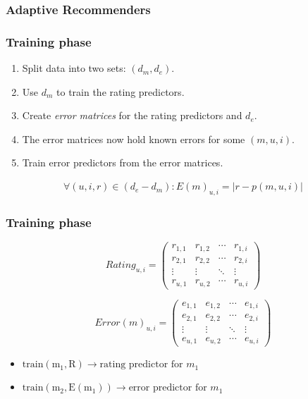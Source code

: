 \documentclass[screen]{beamer}
\begin{document}
\begin{frame}
  \frametitle{Adaptive Recommenders}
  
\end{frame}

\begin{frame}
  \frametitle{Training phase}
  
  \begin{enumerate}
    \item Split data into two sets: $(d_m,d_e)$.
    \item Use $d_m$ to train the rating predictors.
    \item Create \emph{error matrices} for the rating predictors and $d_e$. 
    \item The error matrices now hold known errors for some $(m,u,i)$.
    \item Train error predictors from the error matrices.
  \end{enumerate}
  
  \begin{eqnarray}
    \forall (u,i,r) \in (d_e - d_m): E(m)_{u,i} = |r - p(m,u,i)|
  \end{eqnarray}
\end{frame}

\begin{frame}
  \frametitle{Training phase}
  
  \begin{equation*}
     Rating_{u,i} =
     \begin{pmatrix}
      r_{1,1} & r_{1,2} & \cdots & r_{1,i} \\
      r_{2,1} & r_{2,2} & \cdots & r_{2,i} \\
      \vdots  & \vdots  & \ddots & \vdots  \\
      r_{u,1} & r_{u,2} & \cdots & r_{u,i}
     \end{pmatrix}
    \end{equation*}

  \vspace{1em}
  
    \begin{equation*}
     Error(m)_{u,i} =
     \begin{pmatrix}
        e_{1,1} & e_{1,2} & \cdots & e_{1,i} \\
        e_{2,1} & e_{2,2} & \cdots & e_{2,i} \\
        \vdots  & \vdots  & \ddots & \vdots  \\
        e_{u,1} & e_{u,2} & \cdots & e_{u,i}
     \end{pmatrix}
    \end{equation*}
    
    \vspace{1em}
    \begin{itemize}
      \item $\mathrm{train(m_1, R)} \rightarrow \text{rating predictor for } m_1$
      \item $\mathrm{train(m_2, E(m_1))} \rightarrow \text{error predictor for } m_1$
    \end{itemize}
\end{frame}
\end{document}
